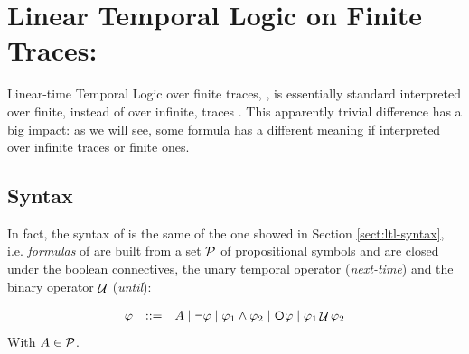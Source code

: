 %

\section{Linear Temporal Logic on Finite Traces: \LTLf}
\label{ltlf}
Linear-time Temporal Logic over finite traces, \LTLf, is essentially standard 
\LTL \citep{Pnueli:1977:TLP:1382431.1382534} interpreted over finite, instead of over infinite, traces \citep{de2013linear}.
This apparently trivial difference has a big impact: as we will see, some \LTL formula has a different meaning if interpreted over infinite traces or finite ones.

\subsection{Syntax}\label{ltlf-syntax}
In fact, the syntax of \LTLf is the same of the one showed in Section \ref{sect:ltl-syntax}, i.e. \emph{formulas} of \LTLf are built from a set $\mathcal{P}$ of propositional symbols and are closed under the boolean connectives, the unary temporal operator \Next (\emph{next-time}) and the binary operator $\mathop{\mathcal{U}}$ (\emph{until}):

\[\begin{array}{rcl}
\varphi &::=& \Atom \mid \lnot \varphi \mid \varphi_1\land \varphi_2 \mid \Next\varphi \mid \varphi_1 \lUntil \varphi_2
\end{array}
\]
With $A\in \mathcal{P}$.


